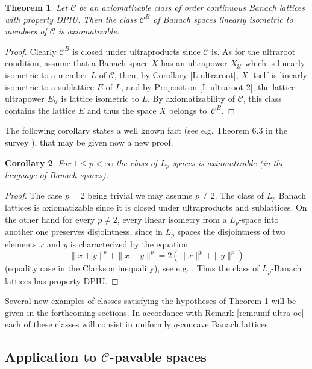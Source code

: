 \documentclass[11pt]{amsart}
\theoremstyle{plain}
\newtheorem{theorem}{Theorem}[section]
\newtheorem{corollary}[theorem]{Corollary}
\theoremstyle{remark}
\newcommand{\C}{\mathcal C}
\newcommand{\U}{\mathcal U}
\begin{document}
\begin{theorem}\label{axiomatizability1}  Let $\C$  be an axiomatizable class of order continuous Banach lattices with property DPIU.  Then the class $\C^B$ of Banach spaces linearly isometric to members of $\C$ is axiomatizable.
\end{theorem}

\begin{proof}  Clearly $\C^B$ is closed under ultraproducts since $\C$ is. As for the ultraroot condition, assume that a Banach space $X$ has an ultrapower $X_\U$ which is linearly isometric to a member $L$ of  $\C$, then, by Corollary \ref{L-ultraroot},  $X$ itself is linearly isometric to a sublattice $E$ of $L$, and by Proposition \ref{L-ultraroot-2}, the lattice ultrapower $E_\U$ is lattice isometric to $L$. By axiomatizability of $\C$, this class contains the lattice $E$  and thus the space $X$ belongs to~$\C^B$.
\end{proof}

The following corollary states a well known fact (see e.g. Theorem 6.3 in the survey \cite{CWH}), that may be given now a new proof.

\begin{corollary} For $1\le p<\infty$ the class of $L_p$-spaces is axiomatizable (in the language of Banach spaces).
\end{corollary}

\begin{proof} The case $p=2$ being trivial we may assume $p\ne 2$. The class of $L_p$ Banach lattices is axiomatizable since it is closed under ultraproducts and sublattices. On the other hand for every $p\ne 2$, every linear isometry from a $L_p$-space into another one preserves disjointness, since in $L_p$ spaces the disjointness of two elements $x$ and $y$ is characterized by the equation
\begin{equation}
\|x+y\|^p+\|x-y\|^p=2(\|x\|^p+\|y\|^p)\tag{$EC_p$}
\end{equation}
(equality case in the Clarkson inequality), see e.g. \cite[Cor. 2.1]{La}. Thus the class of $L_p$-Banach lattices has property DPIU.
\end{proof}

Several new examples of classes satisfying the hypotheses of Theorem \ref{axiomatizability1} will be given in the forthcoming sections. In accordance with Remark \ref{rem:unif-ultra-oc} each of these classes  will consist in uniformly  $q$-concave Banach lattices. 

\subsection{Application to $\C$-pavable spaces}\label{subsec:applic-C-pav} \hfil
\end{document}
